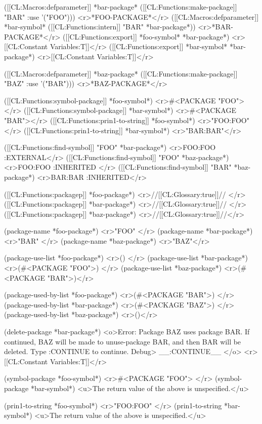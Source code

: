 ([[CL:Macros:defparameter]] *bar-package* ([[CL:Functions:make-package]] "BAR" :use '("FOO"))) <r>*FOO-PACKAGE*</r>
([[CL:Macros:defparameter]] *bar-symbol* ([[CL:Functions:intern]] "BAR" *bar-package*)) <r>*BAR-PACKAGE*</r>
([[CL:Functions:export]] *foo-symbol* *bar-package*) <r>[[CL:Constant Variables:T]]</r>
([[CL:Functions:export]] *bar-symbol* *bar-package*) <r>[[CL:Constant Variables:T]]</r>

([[CL:Macros:defparameter]] *baz-package* ([[CL:Functions:make-package]] "BAZ" :use '("BAR"))) <r>*BAZ-PACKAGE*</r>

([[CL:Functions:symbol-package]] *foo-symbol*) <r>#<PACKAGE "FOO"> </r>
([[CL:Functions:symbol-package]] *bar-symbol*) <r>#<PACKAGE "BAR"></r>
([[CL:Functions:prin1-to-string]] *foo-symbol*) <r>"FOO:FOO" </r>
([[CL:Functions:prin1-to-string]] *bar-symbol*) <r>"BAR:BAR"</r>

([[CL:Functions:find-symbol]] "FOO" *bar-package*) <r>FOO:FOO
:EXTERNAL</r>
([[CL:Functions:find-symbol]] "FOO" *baz-package*) <r>FOO:FOO
:INHERITED </r>
([[CL:Functions:find-symbol]] "BAR" *baz-package*) <r>BAR:BAR
:INHERITED</r>

([[CL:Functions:packagep]] *foo-package*) <r>//[[CL:Glossary:true]]// </r>
([[CL:Functions:packagep]] *bar-package*) <r>//[[CL:Glossary:true]]// </r>
([[CL:Functions:packagep]] *baz-package*) <r>//[[CL:Glossary:true]]//</r>

(package-name *foo-package*) <r>"FOO" </r>
(package-name *bar-package*) <r>"BAR" </r>
(package-name *baz-package*) <r>"BAZ"</r>

(package-use-list *foo-package*) <r>() </r>
(package-use-list *bar-package*) <r>(#<PACKAGE "FOO">) </r>
(package-use-list *baz-package*) <r>(#<PACKAGE "BAR">)</r>

(package-used-by-list *foo-package*) <r>(#<PACKAGE "BAR">) </r>
(package-used-by-list *bar-package*) <r>(#<PACKAGE "BAZ">) </r>
(package-used-by-list *baz-package*) <r>()</r>

(delete-package *bar-package*)
<o>Error: Package BAZ uses package BAR.
If continued, BAZ will be made to unuse-package BAR,
and then BAR will be deleted.
Type :CONTINUE to continue.
Debug> __:CONTINUE__ </o>
<r>[[CL:Constant Variables:T]]</r>

(symbol-package *foo-symbol*) <r>#<PACKAGE "FOO"> </r>
(symbol-package *bar-symbol*) <u>The return value of the above is unspecified.</u>

(prin1-to-string *foo-symbol*) <r>"FOO:FOO" </r>
(prin1-to-string *bar-symbol*) <u>The return value of the above is unspecified.</u>

